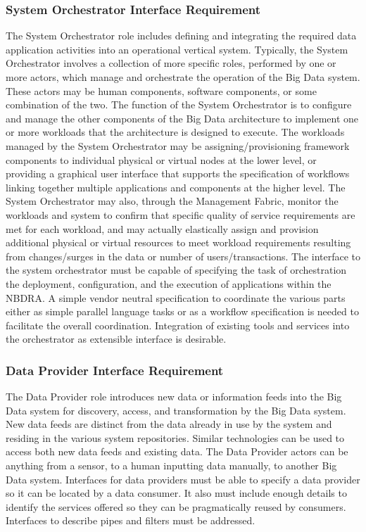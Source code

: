 \documentclass[10pt]{article}
\begin{document}
\subsubsection{System Orchestrator Interface Requirement}

The System Orchestrator role includes defining and integrating the required data application activities into an operational vertical system. Typically, the System Orchestrator involves a collection of more specific roles, performed by one or more actors, which manage and orchestrate the operation of the Big Data system. These actors may be human components, software components, or some combination of the two. The function of the System Orchestrator is to configure and manage the other components of the Big Data architecture to implement one or more workloads that the architecture is designed to execute. The workloads managed by the System Orchestrator may be assigning/provisioning framework components to individual physical or virtual nodes at the lower level, or providing a graphical user interface that supports the specification of workflows linking together multiple applications and components at the higher level. The System Orchestrator may also, through the Management Fabric, monitor the workloads and system to confirm that specific quality of service requirements are met for each workload, and may actually elastically assign and provision additional physical or virtual resources to meet workload requirements resulting from changes/surges in the data or number of users/transactions.
The interface to the system orchestrator must be capable of specifying the task of orchestration the deployment, configuration, and the execution of applications within the NBDRA. A simple vendor neutral specification to coordinate the various parts either as simple parallel language tasks or as a workflow specification is needed to facilitate the overall coordination. Integration of existing tools and services into the orchestrator as extensible interface is desirable.

\subsubsection{Data Provider Interface Requirement}

The Data Provider role introduces new data or information feeds into the Big Data system for discovery, access, and transformation by the Big Data system. New data feeds are distinct from the data already in use by the system and residing in the various system repositories. Similar technologies can be used to access both new data feeds and existing data. The Data Provider actors can be anything from a sensor, to a human inputting data manually, to another Big Data system.
Interfaces for data providers must be able to specify a data provider so it can be located by a data consumer. It also must include enough details to identify the services offered so they can be pragmatically reused by consumers. Interfaces to describe pipes and filters must be addressed.
\end{document}
